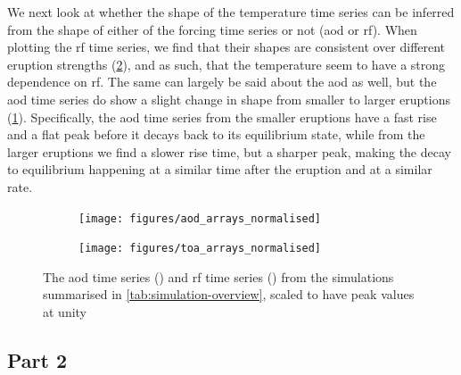 \documentclass{ametsocV5}
\begin{document}
We next look at whether the shape of the temperature time series can be inferred from
the shape of either of the forcing time series or not (\ac{aod} or \ac{rf}). When
plotting the \ac{rf} time series, we find that their shapes are consistent over
different eruption strengths (\cref{fig:toa_arrays_normalised}), and as such, that the
temperature seem to have a strong dependence on \ac{rf}. The same can largely be said
about the \ac{aod} as well, but the \ac{aod} time series do show a slight change in
shape from smaller to larger eruptions (\cref{fig:aod_arrays_normalised}). Specifically,
the \ac{aod} time series from the smaller eruptions have a fast rise and a flat peak
before it decays back to its equilibrium state, while from the larger eruptions we find
a slower rise time, but a sharper peak, making the decay to equilibrium happening at a
similar time after the eruption and at a similar rate.

\begin{figure}
  \begin{subfigure}{\linewidth}
    \centering
    \texttt{[image: figures/aod\_arrays\_normalised]}
    \caption{}%
    \label{fig:aod_arrays_normalised}
  \end{subfigure}
  \begin{subfigure}{\linewidth}
    \centering
    \texttt{[image: figures/toa\_arrays\_normalised]}
    \caption{}%
    \label{fig:toa_arrays_normalised}
  \end{subfigure}

  \caption{The \ac{aod} time series () and \ac{rf} time
    series () from the simulations summarised in
    \cref{tab:simulation-overview}, scaled to have peak values at unity
  }\label{fig:arrays_normalised}
\end{figure}

\subsection{Part 2}
\end{document}
